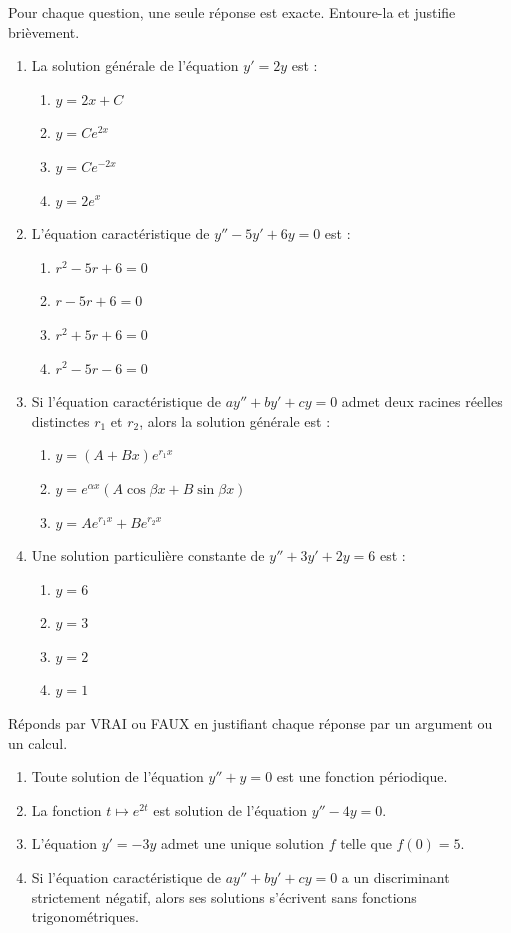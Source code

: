 \documentclass[11pt]{article}
\begin{document}
\begin{exercice}
Pour chaque question, une seule réponse est exacte. Entoure-la et justifie brièvement.
\begin{enumerate}
\item La solution générale de l'équation $y' = 2y$ est :
\begin{enumerate}
\item $y = 2x + C$ \quad \item $y = Ce^{2x}$ \quad \item $y = Ce^{-2x}$ \quad \item $y = 2e^{x}$
\end{enumerate}
\item L'équation caractéristique de $y'' - 5y' + 6y = 0$ est :
\begin{enumerate}
\item $r^2 - 5r + 6 = 0$ \quad \item $r - 5r + 6 = 0$ \quad \item $r^2 + 5r + 6 = 0$ \quad \item $r^2 - 5r - 6 = 0$
\end{enumerate}
\item Si l'équation caractéristique de $ay'' + by' + cy = 0$ admet deux racines réelles distinctes $r_1$ et $r_2$, alors la solution générale est :
\begin{enumerate}
\item $y = (A + Bx)e^{r_1 x}$ \quad \item $y = e^{\alpha x}(A\cos\beta x + B\sin\beta x)$ \quad \item $y = Ae^{r_1 x} + Be^{r_2 x}$
\end{enumerate}
\item Une solution particulière constante de $y'' + 3y' + 2y = 6$ est :
\begin{enumerate}
\item $y = 6$ \quad \item $y = 3$ \quad \item $y = 2$ \quad \item $y = 1$
\end{enumerate}
\end{enumerate}
\end{exercice}

\begin{exercice}
Réponds par VRAI ou FAUX en justifiant chaque réponse par un argument ou un calcul.
\begin{enumerate}
\item Toute solution de l'équation $y'' + y = 0$ est une fonction périodique.
\item La fonction $t \longmapsto e^{2t}$ est solution de l'équation $y'' - 4y = 0$.
\item L'équation $y' = -3y$ admet une unique solution $f$ telle que $f(0) = 5$.
\item Si l'équation caractéristique de $ay'' + by' + cy = 0$ a un discriminant strictement négatif, alors ses solutions s'écrivent sans fonctions trigonométriques.
\end{enumerate}
\end{exercice}
\end{document}
